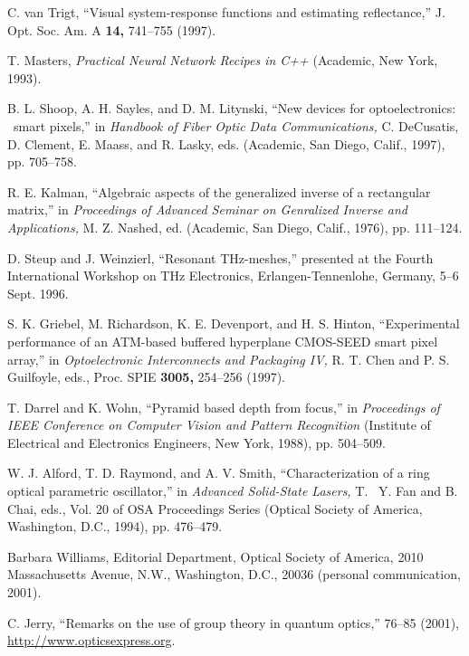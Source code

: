 \documentclass[letterpaper,12pt]{article}   %
\begin{document}
\begin{thebibliography}{99}

C. van Trigt, ``Visual system-response functions and estimating reflectance,'' %
J. Opt. Soc. Am. A {\bf 14,} 741--755 (1997).

T. Masters, {\it Practical Neural Network Recipes in C++} (Academic,
New York, 1993).

B. L. Shoop, A. H. Sayles, and D. M. Litynski, ``New devices for
optoelectronics:  \ smart pixels,'' in {\it Handbook of Fiber
Optic Data Communications,} C. DeCusatis, D. Clement, E. Maass,
and R. Lasky, eds. (Academic, San Diego, Calif., 1997), pp.
705--758.

R. E. Kalman, ``Algebraic aspects of the generalized inverse of a
rectangular matrix,'' in {\it Proceedings of Advanced Seminar on
Genralized Inverse and Applications,} M. Z. Nashed, ed. (Academic,
San Diego, Calif., 1976), pp. 111--124.

D. Steup and J. Weinzierl, ``Resonant THz-meshes,'' presented at the
Fourth International Workshop on THz Electronics,
Erlangen-Tennenlohe, Germany, 5--6 Sept. 1996.

 S. K. Griebel, M. Richardson, K. E. Devenport, and H. S. Hinton,
``Experimental performance of an ATM-based buffered hyperplane
CMOS-SEED smart pixel array,'' in {\it Optoelectronic
Interconnects and Packaging IV,} R. T. Chen and P. S. Guilfoyle,
eds., Proc. SPIE {\bf 3005,} 254--256 (1997).

T. Darrel and K. Wohn, ``Pyramid based depth from focus,'' in
{\it Proceedings of IEEE Conference on Computer Vision and Pattern
Recognition} (Institute of Electrical and Electronics Engineers,
New York, 1988), pp. 504--509.

 W. J. Alford, T. D. Raymond, and A. V. Smith, ``Characterization of a ring optical
parametric oscillator,'' in {\it Advanced Solid-State Lasers,} T.~
Y. Fan and B. Chai, eds., Vol. 20 of OSA Proceedings Series
(Optical Society of America, Washington, D.C., 1994), pp.
476--479.

Barbara Williams, Editorial Department, Optical Society of
America, 2010 Massa\-chusetts Avenue, N.W., Washington, D.C.,
20036 (personal communication, 2001).

C. Jerry, ``Remarks on the use of group
theory in quantum optics,''  76--85 (2001),
\href{http://www.opticsexpress.org}{http://www.opticsexpress.org}.

\end{thebibliography}
\end{document}
